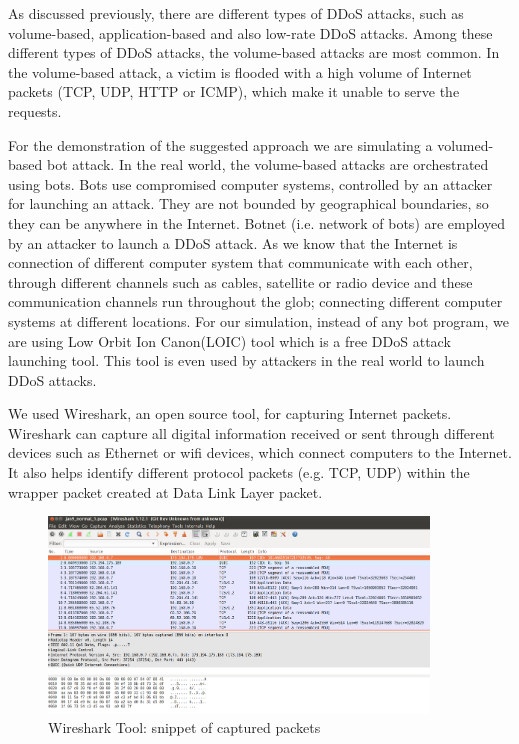 \documentclass[12pt,oneside,a4paper]{article}
\begin{document}
As discussed previously, there are different types of DDoS attacks, such as volume-based, application-based and also low-rate DDoS attacks. Among these different types of DDoS attacks, the volume-based attacks are most common. In the volume-based attack, a victim is flooded with a high volume of Internet packets (TCP, UDP, HTTP or ICMP), which make it unable to serve the requests.

For the demonstration of the suggested approach we are simulating a volumed-based bot attack. In the real world, the volume-based attacks are orchestrated using bots. Bots use compromised computer systems, controlled by an attacker for launching an attack. They are not bounded by geographical boundaries, so they can be anywhere in the Internet. Botnet (i.e. network of bots) are employed by an attacker to launch a DDoS attack. As we know that the Internet is connection of different computer system that communicate with each other, through different channels such as cables, satellite or radio device and these communication channels run throughout the glob; connecting different computer systems at different locations. For our simulation, instead of any bot program, we are using Low Orbit Ion Canon(LOIC) tool which is a free DDoS attack launching tool. This tool is even used by attackers in the real world to launch DDoS attacks.

We used Wireshark, an open source tool, for capturing Internet packets. Wireshark can capture all digital information received or sent through different devices such as Ethernet or wifi devices, which connect computers to the Internet. It also helps identify different protocol packets (e.g. TCP, UDP) within the wrapper packet created at Data Link Layer packet.\par

\begin{figure}[H]
\centering
\includegraphics[width=0.90\textwidth]{Wireshark_Tools.png}
\caption{Wireshark Tool: snippet of captured packets} \label{fig:wireshark}
\end{figure}
\end{document}
